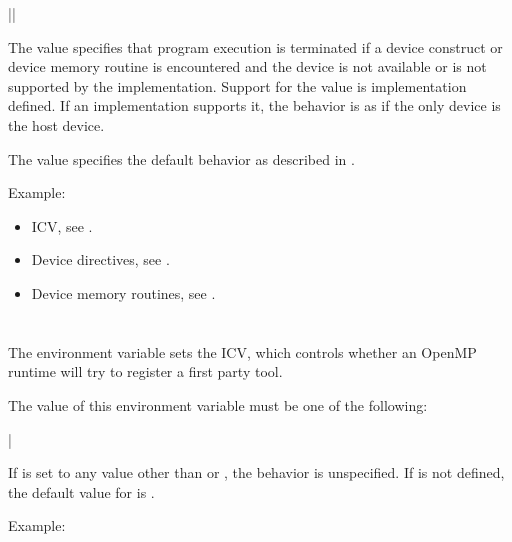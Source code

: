 {||}

The  value specifies that program execution is terminated if 
a device construct or device memory routine is encountered and the device is 
not available or is not supported by the implementation. Support for the 
 value is implementation defined.  If an implementation supports 
it, the behavior is as if the only device is the host device.

The  value specifies the default behavior as described in 
.

Example:
\begin{ompEnv}
\end{ompEnv}

\crossreferences
\begin{itemize}
\item {} ICV, see .

\item Device directives, see .

\item Device memory routines, see .
\end{itemize}



\section{}
\label{sec:OMP_TOOL}

The  environment variable sets the  ICV, which 
controls whether an OpenMP runtime will try to register a first party tool.

The value of this environment variable must be one of the following:

{|}

If  is set to any value other than  or 
, the behavior is unspecified. If  is not 
defined, the default value for  is .

Example:
\begin{ompEnv}
\end{ompEnv}

